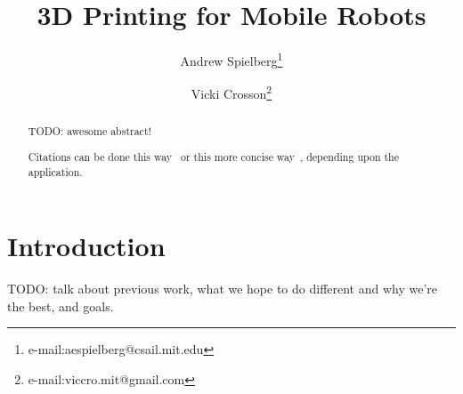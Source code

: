 \documentclass[conference]{acmsiggraph}
\title{3D Printing for Mobile Robots}
\author{Andrew Spielberg\thanks{e-mail:aespielberg@csail.mit.edu} \and Vicki Crosson\thanks{e-mail:viccro.mit@gmail.com}}
\begin{document}

\maketitle

\begin{abstract}

TODO: awesome abstract!

Citations can be done this way~\cite{Jobs95} or this more concise 
way~, depending upon the application.



\end{abstract}


\keywordlist


\TOGlinkslist


\copyrightspace

\section{Introduction}




TODO: talk about previous work, what we hope to do different and why we're the best, and goals.
\end{document}
